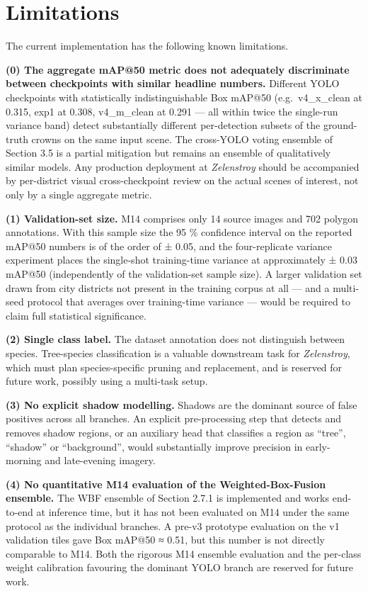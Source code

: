 \section{Limitations}\label{limitations}

The current implementation has the following known limitations.

\textbf{(0) The aggregate mAP@50 metric does not adequately discriminate between checkpoints with similar headline numbers.} Different YOLO checkpoints with statistically indistinguishable Box mAP@50 (e.g.~v4\_x\_clean at 0.315, exp1 at 0.308, v4\_m\_clean at 0.291 --- all within twice the single-run variance band) detect substantially different per-detection subsets of the ground-truth crowns on the same input scene. The cross-YOLO voting ensemble of Section 3.5 is a partial mitigation but remains an ensemble of qualitatively similar models. Any production deployment at \emph{Zelenstroy} should be accompanied by per-district visual cross-checkpoint review on the actual scenes of interest, not only by a single aggregate metric.

\textbf{(1) Validation-set size.} M14 comprises only 14 source images and 702 polygon annotations. With this sample size the 95 \% confidence interval on the reported mAP@50 numbers is of the order of ± 0.05, and the four-replicate variance experiment places the single-shot training-time variance at approximately ± 0.03 mAP@50 (independently of the validation-set sample size). A larger validation set drawn from city districts not present in the training corpus at all --- and a multi-seed protocol that averages over training-time variance --- would be required to claim full statistical significance.

\textbf{(2) Single class label.} The dataset annotation does not distinguish between species. Tree-species classification is a valuable downstream task for \emph{Zelenstroy}, which must plan species-specific pruning and replacement, and is reserved for future work, possibly using a multi-task setup.

\textbf{(3) No explicit shadow modelling.} Shadows are the dominant source of false positives across all branches. An explicit pre-processing step that detects and removes shadow regions, or an auxiliary head that classifies a region as ``tree'', ``shadow'' or ``background'', would substantially improve precision in early-morning and late-evening imagery.

\textbf{(4) No quantitative M14 evaluation of the Weighted-Box-Fusion ensemble.} The WBF ensemble of Section 2.7.1 is implemented and works end-to-end at inference time, but it has not been evaluated on M14 under the same protocol as the individual branches. A pre-v3 prototype evaluation on the v1 validation tiles gave Box mAP@50 ≈ 0.51, but this number is not directly comparable to M14. Both the rigorous M14 ensemble evaluation and the per-class weight calibration favouring the dominant YOLO branch are reserved for future work.

